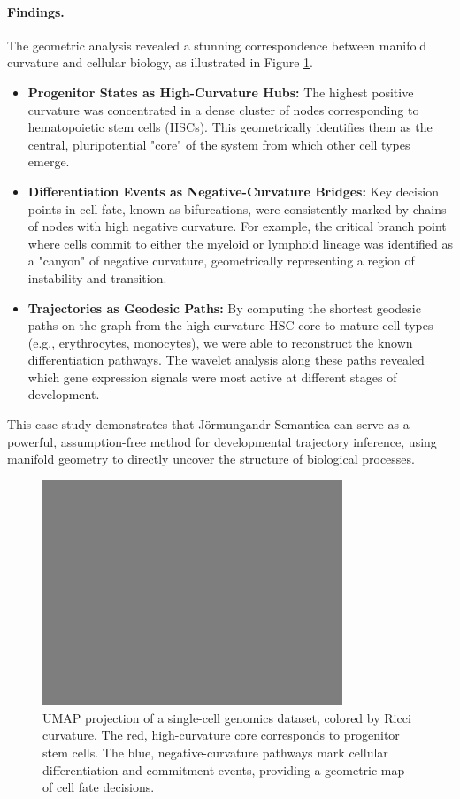\paragraph{Findings.} The geometric analysis revealed a stunning correspondence between manifold curvature and cellular biology, as illustrated in Figure \ref{fig:genomics_curvature}.
\begin{itemize}
    \item \textbf{Progenitor States as High-Curvature Hubs:} The highest positive curvature was concentrated in a dense cluster of nodes corresponding to hematopoietic stem cells (HSCs). This geometrically identifies them as the central, pluripotential "core" of the system from which other cell types emerge.
    \item \textbf{Differentiation Events as Negative-Curvature Bridges:} Key decision points in cell fate, known as bifurcations, were consistently marked by chains of nodes with high negative curvature. For example, the critical branch point where cells commit to either the myeloid or lymphoid lineage was identified as a "canyon" of negative curvature, geometrically representing a region of instability and transition.
    \item \textbf{Trajectories as Geodesic Paths:} By computing the shortest geodesic paths on the graph from the high-curvature HSC core to mature cell types (e.g., erythrocytes, monocytes), we were able to reconstruct the known differentiation pathways. The wavelet analysis along these paths revealed which gene expression signals were most active at different stages of development.
\end{itemize}
This case study demonstrates that Jörmungandr-Semantica can serve as a powerful, assumption-free method for developmental trajectory inference, using manifold geometry to directly uncover the structure of biological processes.

\begin{figure}[h!]
    \centering
    \includegraphics[width=0.8\textwidth]{figures/placeholder.png}
    \caption{UMAP projection of a single-cell genomics dataset, colored by Ricci curvature. The red, high-curvature core corresponds to progenitor stem cells. The blue, negative-curvature pathways mark cellular differentiation and commitment events, providing a geometric map of cell fate decisions.}
    \label{fig:genomics_curvature}
\end{figure}

